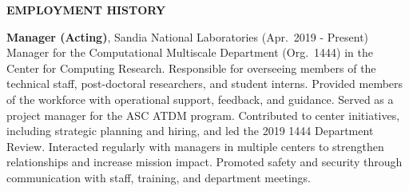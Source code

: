 
\vspace{\sectionskip}
\noindent
{\large \textbf{EMPLOYMENT HISTORY}}
\vspace{\sectionskip}

\begin{minipage}{\minipagewidth}
\textbf{Manager (Acting)}, Sandia National Laboratories (Apr.~2019 - Present) \\
%
Manager for the Computational Multiscale Department (Org.~1444) in the Center for Computing Research.  Responsible for overseeing members of the technical staff, post-doctoral researchers, and student interns.  Provided members of the workforce with operational support, feedback, and guidance.  Served as a project manager for the ASC ATDM program.  Contributed to center initiatives, including strategic planning and hiring, and led the 2019 1444 Department Review.  Interacted regularly with managers in multiple centers to strengthen relationships and increase mission impact.  Promoted safety and security through communication with staff, training, and department meetings.
\end{minipage}\vspace{\parskip}

